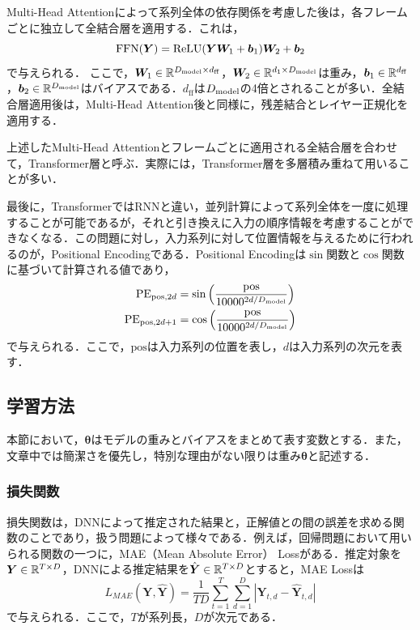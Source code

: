 \documentclass[12pt]{jarticle}
\numberwithin{equation}{section}    %
\numberwithin{figure}{section}      %
\numberwithin{table}{section}      %
\begin{document}
Multi-Head Attentionによって系列全体の依存関係を考慮した後は，各フレームごとに独立して全結合層を適用する．これは，
\begin{equation}
    \text{FFN}(\bm{Y}) = \text{ReLU}(\bm{Y}\bm{W}_{1} + \bm{b}_{1})\bm{W}_{2} + \bm{b}_{2}
\end{equation}
で与えられる．
ここで，$\bm{W}_{1} \in \mathbb{R}^{D_{\text{model}} \times d_{\text{ff}}}$，$\bm{W}_{2} \in \mathbb{R}^{d_{1} \times D_{\text{model}}}$は重み，$\bm{b}_{1} \in \mathbb{R}^{d_{\text{ff}}}$，$\bm{b}_{2} \in \mathbb{R}^{D_{\text{model}}}$はバイアスである．$d_{\text{ff}}$は$D_{\text{model}}$の4倍とされることが多い．全結合層適用後は，Multi-Head Attention後と同様に，残差結合とレイヤー正規化を適用する．

上述したMulti-Head Attentionとフレームごとに適用される全結合層を合わせて，Transformer層と呼ぶ．実際には，Transformer層を多層積み重ねて用いることが多い．

最後に，TransformerではRNNと違い，並列計算によって系列全体を一度に処理することが可能であるが，それと引き換えに入力の順序情報を考慮することができなくなる．この問題に対し，入力系列に対して位置情報を与えるために行われるのが，Positional Encodingである．Positional Encodingは$\sin$関数と$\cos$関数に基づいて計算される値であり，
\begin{align}
    \text{PE}_{\text{pos}, 2d}     & = \sin \left(\frac{\text{pos}}{10000^{2d / D_{\text{model}}}}\right) \\
    \text{PE}_{\text{pos}, 2d + 1} & = \cos \left(\frac{\text{pos}}{10000^{2d / D_{\text{model}}}}\right)
\end{align}
で与えられる．ここで，$\text{pos}$は入力系列の位置を表し，$d$は入力系列の次元を表す．

\subsection{学習方法}
本節において，$\bm{\theta}$はモデルの重みとバイアスをまとめて表す変数とする．また，文章中では簡潔さを優先し，特別な理由がない限りは重み$\bm{\theta}$と記述する．

\subsubsection{損失関数}
損失関数は，DNNによって推定された結果と，正解値との間の誤差を求める関数のことであり，扱う問題によって様々である．例えば，回帰問題において用いられる関数の一つに，MAE（Mean Absolute Error） Lossがある．推定対象を$\bm{Y} \in \mathbb{R}^{T \times D}$，DNNによる推定結果を$\hat{\bm{Y}} \in \mathbb{R}^{T \times D}$とすると，MAE Lossは
\begin{equation}
    L_{MAE}(\bm{Y}, \hat{\bm{Y}}) = \frac{1}{TD} \sum_{t = 1}^{T} \sum_{d = 1}^{D}  |\bm{Y}_{t, d} - \hat{\bm{Y}}_{t, d}|
\end{equation}
で与えられる．ここで，$T$が系列長，$D$が次元である．
\end{document}
